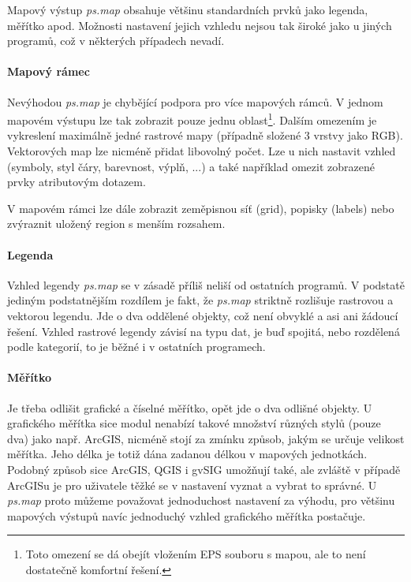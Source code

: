\documentclass[a4paper,12pt,draft]{article}
\newcommand{\modul}[1]{\emph{#1}}
\begin{document}
Mapový výstup \modul{ps.map} obsahuje většinu standardních prvků jako
legenda, měřítko apod. Možnosti nastavení jejich vzhledu nejsou tak
široké jako u jiných programů, což v některých případech nevadí.

\paragraph*{Mapový rámec}
Nevýhodou \modul{ps.map} je chybějící podpora pro více mapových
rámců. V jednom mapovém výstupu lze tak zobrazit pouze jednu
oblast\footnote{Toto omezení se dá obejít vložením EPS souboru s mapou,
ale to není dostatečně komfortní řešení.}. Dalším omezením je
vykreslení maximálně jedné rastrové mapy (případně složené 3 vrstvy
jako RGB). Vektorových map lze nicméně přidat libovolný počet. Lze u
nich nastavit vzhled (symboly, styl čáry, barevnost, výplň, ...) a také
například omezit zobrazené prvky atributovým dotazem.

V mapovém rámci lze dále zobrazit zeměpisnou síť (grid), popisky
(labels) nebo zvýraznit uložený region s menším rozsahem.

\paragraph*{Legenda}
Vzhled legendy \modul{ps.map} se v zásadě příliš neliší od ostatních
programů. V podstatě jediným podstatnějším rozdílem je fakt, že
\modul{ps.map} striktně rozlišuje rastrovou a vektorou legendu. Jde o dva
oddělené objekty, což není obvyklé a asi ani žádoucí řešení. Vzhled
rastrové legendy závisí na typu dat, je buď spojitá, nebo rozdělená
podle kategorií, to je běžné i v ostatních programech.

\paragraph*{Měřítko}
Je třeba odlišit grafické a číselné měřítko, opět jde o dva
odlišné objekty.
U grafického měřítka sice modul nenabízí takové množství různých
stylů (pouze dva) jako např. ArcGIS, nicméně stojí za zmínku způsob,
jakým se určuje velikost měřítka. Jeho délka je totiž dána zadanou
délkou v mapových jednotkách. Podobný způsob sice ArcGIS, QGIS i gvSIG
umožňují také, ale zvláště v případě ArcGISu je pro uživatele
těžké se v nastavení vyznat a vybrat to správné. U \modul{ps.map} proto
můžeme považovat jednoduchost nastavení za výhodu, pro většinu mapových
výstupů navíc jednoduchý vzhled grafického měřítka postačuje.
\end{document}
